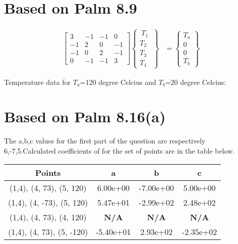 \documentclass{article}
\begin{document}
\section{Based on Palm 8.9}
\begin {align*}
\begin {bmatrix}
3 & -1 & -1 & 0 \\
-1 & 2 & 0 & -1 \\
-1 & 0 & 2 & -1 \\
0 & -1 & -1 & 3 
\end {bmatrix}
\begin {Bmatrix}
~ T_1 ~ \\ T_2 \\ T_3 \\ T_4
\end {Bmatrix}&=
\begin {Bmatrix} 
T_a \\ 0 \\ 0 \\ T_b
\end {Bmatrix}
\end {align*}

Temperature data for $T_a$=120 degree Celcius and $T_b$=20 degree Celcius:
\begin{center}

\end{center}
\section{Based on Palm 8.16(a)}
The a,b,c values for the first part of the question are respectively 6,-7,5.Calculated coefficients of for the set of points are in the table below.

\begin{center}
\begin{tabular}{|c|c|c|c|}
\hline
Points & a & b & c\\\hline
(1,4), (4, 73), (5, 120) & 6.00e+00 & -7.00e+00 & 5.00e+00\\
(1,4), (4, -73), (5, 120) & 5.47e+01 & -2.99e+02 & 2.48e+02\\
(1,4), (4, 73), (4, 120) & \bf{N/A} & \bf{N/A} & \bf{N/A}\\
(1,4), (4, 73), (5, -120) & -5.40e+01 & 2.93e+02 & -2.35e+02\\\hline
\end{tabular}
\end{center}
\end{document}
